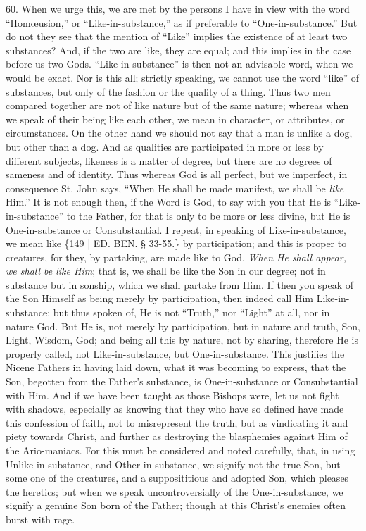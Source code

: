 60. When we urge this, we are
met by the persons I have in view with the word ``Homœusion,'' or ``Like-in-substance,''
as if preferable to ``One-in-substance.'' But do not they see that the
mention of ``Like'' implies the existence of at least two substances?
And, if the two are like, they are equal; and this implies in the case
before us two Gods. ``Like-in-substance'' is then not an advisable word,
when we would be exact. Nor is this all; strictly speaking, we cannot
use the word ``like'' of substances, but only of the fashion or the
quality of a thing. Thus two men compared together are not of like
nature but of the same nature; whereas when we speak of their being
like each other, we mean in character, or attributes, or
circumstances. On the other hand we should not say that a man is
unlike a dog, but other than a dog. And as qualities are participated
in more or less by different subjects, likeness is a matter of degree,
but there are no degrees of sameness and of identity. Thus whereas God
is all perfect, but we imperfect, in consequence St. John says, ``When
He shall be made manifest, we shall be \emph{like} Him.'' It is not
enough then, if the Word is God, to say with you that He is ``Like-in-substance''
to the Father, for that is only to be more or less divine, but He is
One-in-substance or Consubstantial. I repeat, in speaking of
Like-in-substance, we mean like \{149 | ED.
BEN.
§ 33-55.\} by participation; and this is proper to creatures, for
they, by partaking, are made like to God. \emph{When He shall appear, we
shall be like Him}; that is, we shall be like the Son in our
degree; not in substance but in sonship, which we shall partake from
Him. If then you speak of the Son Himself as being merely by
participation, then indeed call Him Like-in-substance; but thus spoken
of, He is not ``Truth,'' nor ``Light'' at all, nor in nature God. But He
is, not merely by participation, but in nature and truth, Son, Light,
Wisdom, God; and being all this by nature, not by sharing, therefore
He is properly called, not Like-in-substance, but One-in-substance.
This justifies the Nicene Fathers in having laid down, what it was
becoming to express, that the Son, begotten from the Father's
substance, is One-in-substance or Consubstantial with Him. And if we
have been taught as those Bishops were, let us not fight with shadows,
especially as knowing that they who have so defined have made this
confession of faith, not to misrepresent the truth, but as vindicating
it and piety towards Christ, and further as destroying the blasphemies
against Him of the Ario-maniacs. For this must be considered and noted
carefully, that, in using Unlike-in-substance, and Other-in-substance,
we signify not the true Son, but some one of the creatures, and a
supposititious and adopted Son, which pleases the heretics; but when
we speak uncontroversially of the One-in-substance, we signify a
genuine Son born of the Father; though at this Christ's enemies often
burst with rage.

